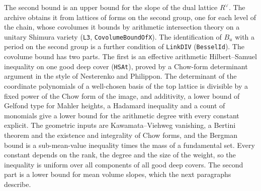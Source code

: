 \documentclass[11pt,letterpaper]{article}
\numberwithin{equation}{section}
\begin{document}
The second bound is an upper bound for the slope of the dual lattice $R^\vee$. The archive obtains it from lattices of forms on the second group, one for each level of the chain, whose covolumes it bounds by arithmetic intersection theory on a unitary Shimura variety (\texttt{L3}, \texttt{CovolumeBoundOfX}). The identification of $B_u$ with a period on the second group is a further condition of \texttt{LinkDIV} (\texttt{BesselId}). The covolume bound has two parts. The first is an effective arithmetic Hilbert--Samuel inequality on one good deep cover (\texttt{HSAt}), proved by a Chow-form determinant argument in the style of Nesterenko and Philippon. The determinant of the coordinate polynomials of a well-chosen basis of the top lattice is divisible by a fixed power of the Chow form of the image, and additivity, a lower bound of Gelfond type for Mahler heights, a Hadamard inequality and a count of monomials give a lower bound for the arithmetic degree with every constant explicit. The geometric inputs are Kawamata--Viehweg vanishing, a Bertini theorem and the existence and integrality of Chow forms, and the Bergman bound is a sub-mean-value inequality times the mass of a fundamental set. Every constant depends on the rank, the degree and the size of the weight, so the inequality is uniform over all components of all good deep covers. The second part is a lower bound for mean volume slopes, which the next paragraphs describe.
\end{document}

